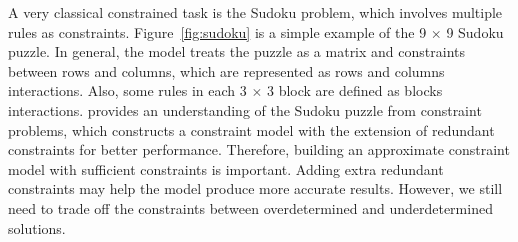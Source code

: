 \par A very classical constrained task is the Sudoku problem, which involves multiple rules as constraints. Figure~\ref{fig:sudoku} is a simple example of the 9 $\times$ 9 Sudoku puzzle. In general, the model treats the puzzle as a matrix and constraints between rows and columns, which are represented as rows and columns interactions. Also, some rules in each 3 $\times$ 3 block are defined as blocks interactions. \cite{SH:05} provides an understanding of the Sudoku puzzle from constraint problems, which constructs a constraint model with the extension of redundant constraints for better performance. Therefore, building an approximate constraint model with sufficient constraints is important. Adding extra redundant constraints may help the model produce more accurate results. However, we still need to trade off the constraints between overdetermined and underdetermined solutions. 

